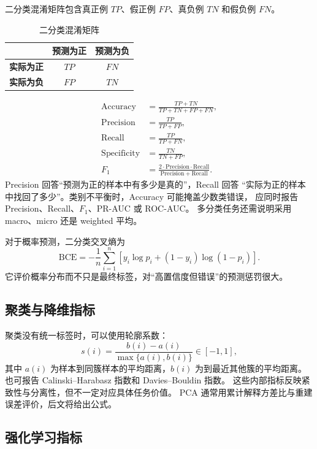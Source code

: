\documentclass[UTF8,zihao=-4,a4paper,fontset=windows]{ctexart}
\begin{document}
二分类混淆矩阵包含真正例 $TP$、假正例 $FP$、真负例 $TN$ 和假负例 $FN$。
\begin{table}[H]
\centering
\caption{二分类混淆矩阵}
\begin{tabular}{c cc}
\toprule
& \textbf{预测为正} & \textbf{预测为负}\\
\midrule
\textbf{实际为正} & $TP$ & $FN$\\
\textbf{实际为负} & $FP$ & $TN$\\
\bottomrule
\end{tabular}
\end{table}

\begin{align}
  \mathrm{Accuracy}
  &=\frac{TP+TN}{TP+TN+FP+FN},\\
  \mathrm{Precision}
  &=\frac{TP}{TP+FP},\\
  \mathrm{Recall}
  &=\frac{TP}{TP+FN},\\
  \mathrm{Specificity}
  &=\frac{TN}{TN+FP},\\
  F_1
  &=\frac{2\cdot\mathrm{Precision}\cdot\mathrm{Recall}}
  {\mathrm{Precision}+\mathrm{Recall}}.
\end{align}
Precision 回答“预测为正的样本中有多少是真的”，Recall 回答
“实际为正的样本中找回了多少”。类别不平衡时，Accuracy 可能掩盖少数类错误，
应同时报告 Precision、Recall、$F_1$、PR-AUC 或 ROC-AUC。
多分类任务还需说明采用 macro、micro 还是 weighted 平均。

对于概率预测，二分类交叉熵为
\begin{equation}
  \mathrm{BCE}
  =-\frac{1}{n}\sum_{i=1}^{n}
  \left[y_i\log p_i+(1-y_i)\log(1-p_i)\right].
\end{equation}
它评价概率分布而不只是最终标签，对“高置信度但错误”的预测惩罚很大。

\subsection{聚类与降维指标}

聚类没有统一标签时，可以使用轮廓系数：
\begin{equation}
  s(i)=\frac{b(i)-a(i)}{\max\{a(i),b(i)\}}\in[-1,1],
\end{equation}
其中 $a(i)$ 为样本到同簇样本的平均距离，$b(i)$ 为到最近其他簇的平均距离。
也可报告 Calinski--Harabasz 指数和 Davies--Bouldin 指数。
这些内部指标反映紧致性与分离性，但不一定对应具体任务价值。
PCA 通常用累计解释方差比与重建误差评价，后文将给出公式。

\subsection{强化学习指标}
\end{document}
